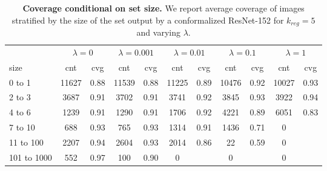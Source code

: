 \begin{table}[t]
\centering
\small
\begin{tabular}{lcccccccccc} 
\toprule
         & \multicolumn{2}{c}{$\lambda={0}$}     & \multicolumn{2}{c}{$\lambda={0.001}$}     & \multicolumn{2}{c}{$\lambda={0.01}$}     & \multicolumn{2}{c}{$\lambda={0.1}$}     & \multicolumn{2}{c}{$\lambda={1}$}    \\ 
         \cmidrule(r){2-3}     \cmidrule(r){4-5}     \cmidrule(r){6-7}     \cmidrule(r){8-9}     \cmidrule(r){10-11}    
size &cnt & cvg     &cnt & cvg     &cnt & cvg     &cnt & cvg     &cnt & cvg     \\ 
\midrule 
0 to 1      & 11627 & 0.88  & 11539 & 0.88  & 11225 & 0.89  & 10476 & 0.92  & 10027 & 0.93 \\ 
2 to 3      & 3687 & 0.91  & 3702 & 0.91  & 3741 & 0.92  & 3845 & 0.93  & 3922 & 0.94 \\ 
4 to 6      & 1239 & 0.91  & 1290 & 0.91  & 1706 & 0.92  & 4221 & 0.89  & 6051 & 0.83 \\ 
7 to 10      & 688 & 0.93  & 765 & 0.93  & 1314 & 0.91  & 1436 & 0.71  & 0 & \\ 
11 to 100      & 2207 & 0.94  & 2604 & 0.93  & 2014 & 0.86  & 22 & 0.59  & 0 & \\ 
101 to 1000      & 552 & 0.97  & 100 & 0.90  & 0 &  & 0 &  & 0 & \\ 
\bottomrule
\end{tabular}
\caption{\textbf{Coverage conditional on set size.} We report average coverage of images stratified by the size of the set output by a conformalized ResNet-152 for $k_{reg}=5$ and varying $\lambda$.}
\label{table:adaptiveness}
\end{table}
